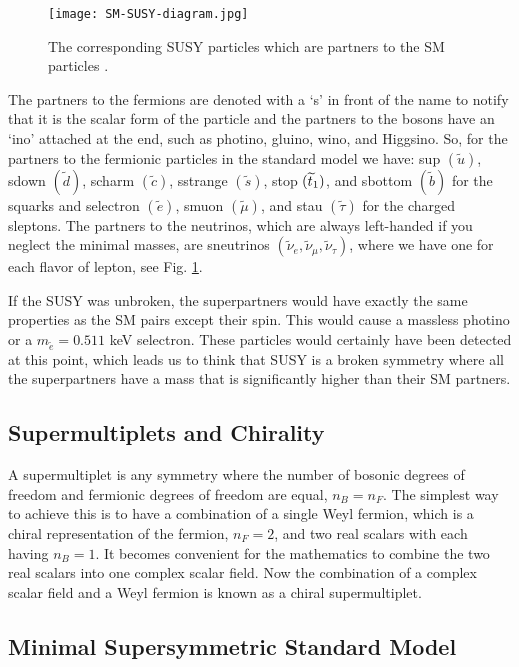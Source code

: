 \begin{figure}
 	\centering
	\texttt{[image: SM-SUSY-diagram.jpg]}
 	\caption[Supersymmetry and Standard Model Particles]{The corresponding SUSY particles which are partners to the SM particles \cite{francis_sort_2014}.}
 	\label{SUSYParticles} 
\end{figure}

The partners to the fermions are denoted with a `s' in front of the name to notify that it is the scalar form of the particle and the partners to the bosons have an `ino' attached at the end, such as photino, gluino, wino, and Higgsino. So, for the partners to the fermionic particles in the standard model we have: sup $(\widetilde{u})$, sdown $(\widetilde{d})$, scharm $(\widetilde{c})$, sstrange $(\widetilde{s})$, stop $(\widetilde{t}_1)$, and sbottom $(\widetilde{b})$ for the squarks and selectron $(\widetilde{e})$, smuon $(\widetilde{\mu})$, and stau $(\widetilde{\tau})$ for the charged sleptons. The partners to the neutrinos, which are always left-handed if you neglect the minimal masses, are sneutrinos $(\widetilde{\nu}_e, \widetilde{\nu}_\mu, \widetilde{\nu}_\tau)$, where we have one for each flavor of lepton, see Fig. \ref{SUSYParticles}. 

If the SUSY was unbroken, the superpartners would have exactly the same properties as the SM pairs except their spin. This would cause a massless photino or a $m_{\widetilde{e}}=0.511$ keV selectron. These particles would certainly have been detected at this point, which leads us to think that SUSY is a broken symmetry where all the superpartners have a mass that is significantly higher than their SM partners. 

\subsection{Supermultiplets and Chirality}
\label{subsec:chiral}

A supermultiplet is any symmetry where the number of bosonic degrees of freedom and fermionic degrees of freedom are equal, $n_B=n_F$. The simplest  way to achieve this is to have a combination of a single Weyl fermion, which is a chiral representation of the fermion, $n_F=2$, and two real scalars with each having $n_B=1$. It becomes convenient for the mathematics to combine the two real scalars into one complex scalar field. Now the combination of a complex scalar field and a Weyl fermion is known as a chiral supermultiplet. 

\subsection{Minimal Supersymmetric Standard Model}
\label{sec:MSSM}

